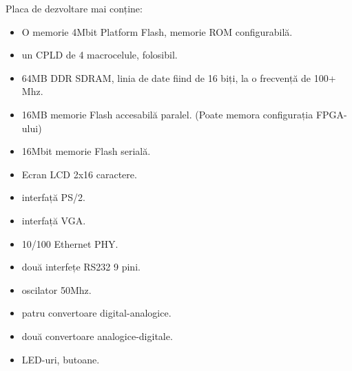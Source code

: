 \documentclass[12pt,twoside,a4paper,fleqn]{book}
\begin{document}
Placa de dezvoltare mai conține:
\begin{itemize}
\item O memorie 4Mbit Platform Flash, memorie ROM configurabilă.
\item un CPLD de 4 macrocelule, folosibil.
\item 64MB DDR SDRAM, linia de date fiind de 16 biți, la o frecvență de 100+ Mhz.
\item 16MB memorie Flash accesabilă paralel. (Poate memora configurația FPGA-ului)
\item 16Mbit memorie Flash serială.
\item Ecran LCD 2x16 caractere.
\item interfață PS/2.
\item interfață VGA.
\item 10/100 Ethernet PHY.
\item două interfețe RS232 9 pini.
\item oscilator 50Mhz.
\item patru convertoare digital-analogice.
\item două convertoare analogice-digitale.
\item LED-uri, butoane.
\end{itemize}
\end{document}
